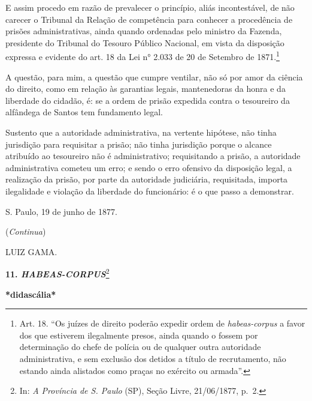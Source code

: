 E assim procedo em razão de prevalecer o princípio, aliás incontestável,
de não carecer o Tribunal da Relação de competência para conhecer a
procedência de prisões administrativas, ainda quando ordenadas pelo
ministro da Fazenda, presidente do Tribunal do Tesouro Público Nacional,
em vista da disposição expressa e evidente do art. 18 da Lei n° 2.033 de
20 de Setembro de 1871.\footnote{Art. 18. ``Os juízes de direito poderão
  expedir ordem de \emph{habeas-corpus} a favor dos que estiverem
  ilegalmente presos, ainda quando o fossem por determinação do chefe de
  polícia ou de qualquer outra autoridade administrativa, e sem exclusão
  dos detidos a título de recrutamento, não estando ainda alistados como
  praças no exército ou armada''.}

A questão, para mim, a questão que cumpre ventilar, não só por amor da
ciência do direito, como em relação às garantias legais, mantenedoras da
honra e da liberdade do cidadão, é: se a ordem de prisão expedida contra
o tesoureiro da alfândega de Santos tem fundamento legal.

Sustento que a autoridade administrativa, na vertente hipótese, não
tinha jurisdição para requisitar a prisão; não tinha jurisdição porque o
alcance atribuído ao tesoureiro não é administrativo; requisitando a
prisão, a autoridade administrativa cometeu um erro; e sendo o erro
ofensivo da disposição legal, a realização da prisão, por parte da
autoridade judiciária, requisitada, importa ilegalidade e violação da
liberdade do funcionário: é o que passo a demonstrar.

S. Paulo, 19 de junho de 1877.

(\emph{Continua})

LUIZ GAMA.

\textbf{11. \emph{HABEAS-CORPUS}}\footnote{In: \emph{A Província de S.
  Paulo} (SP), Seção Livre, 21/06/1877, p.~2.}

\textbf{*didascália*}

